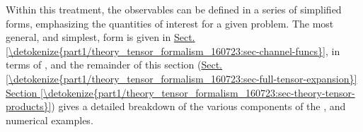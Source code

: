 \documentclass[letterpaper,table,10pt,english]{jupyterBook}
\begin{document}
\sphinxAtStartPar
Within this treatment, the observables can be defined in a series of simplified forms, emphasizing the quantities of interest for a given problem. The most general, and simplest, form is given in \hyperref[\detokenize{part1/theory_tensor_formalism_160723:sec-channel-funcs}]{Sect.\@ \ref{\detokenize{part1/theory_tensor_formalism_160723:sec-channel-funcs}}}, in terms of {\hyperref[\detokenize{backmatter/glossary:term-channel-functions}]{}}, and the remainder of this section (\hyperref[\detokenize{part1/theory_tensor_formalism_160723:sec-full-tensor-expansion}]{Sect.\@ \ref{\detokenize{part1/theory_tensor_formalism_160723:sec-full-tensor-expansion}}} \sphinxhyphen{} \hyperref[\detokenize{part1/theory_tensor_formalism_160723:sec-theory-tensor-products}]{Section \ref{\detokenize{part1/theory_tensor_formalism_160723:sec-theory-tensor-products}}}) gives a detailed breakdown of the various components of the {\hyperref[\detokenize{backmatter/glossary:term-channel-functions}]{}}, and numerical examples.
\end{document}
